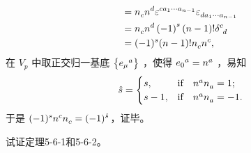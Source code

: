 \begin{xiti}
\begin{zm}
\begin{align*}
		=&\; \tensor{n}{_c} \tensor{n}{^d} \tensor{\varepsilon}{^{c a_1 \cdots a_{n-1}}} \tensor{\varepsilon}{_{d a_1 \cdots a_{n-1}}}\\
		=&\; \tensor{n}{_c} \tensor{n}{^d} \left(-1\right)^s \left(n-1\right)! \tensor{\delta}{^c_d}\\
		=& \; (-1)^s (n-1)! \tensor{n}{_c} \tensor{n}{^c},
		\end{align*}
		在 $V_p$ 中取正交归一基底 $\left\{\tensor{{e_\mu}}{^a}\right\}$ ，使得 $\tensor{{e_0}}{^a}=\tensor{n}{^a}$ ，易知
		\begin{displaymath}
		\hat{s}=\begin{cases}
		s, &\qif* \tensor{n}{^a}\tensor{n}{_a}=1;\\
		s-1, &\qif* \tensor{n}{^a}\tensor{n}{_a}=-1.
		\end{cases}
		\end{displaymath}
		于是 $(-1)^s \tensor{n}{^c} \tensor{n}{_c} = (-1)^{\hat{s}} $，证毕。
	\end{zm}
	
	\item 试证定理5-6-1和5-6-2。
	

\end{xiti}
